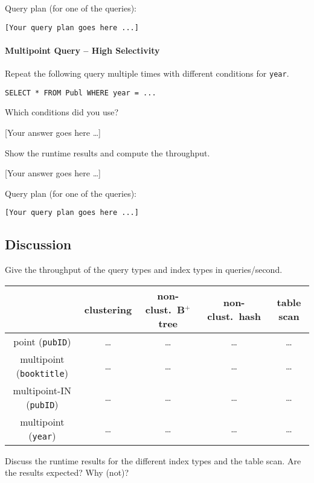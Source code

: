 \documentclass[11pt]{scrartcl}
\newcommand{\youranswerhere}{[Your answer goes here \ldots]}
\begin{document}
Query plan (for one of the queries):

{\small
\parskip0pt\begin{verbatim}
[Your query plan goes here ...]
\end{verbatim}}

\paragraph{Multipoint Query -- High Selectivity}

Repeat the following query multiple times with different conditions for \texttt{year}.

\begin{lstlisting}[style=dbtsql]
SELECT * FROM Publ WHERE year = ...
\end{lstlisting}

Which conditions did you use?

\youranswerhere{}

Show the runtime results and compute the throughput.

\youranswerhere{}

Query plan (for one of the queries):

{\small
\parskip0pt\begin{verbatim}
[Your query plan goes here ...]
\end{verbatim}}

\subsection*{Discussion}

Give the throughput of the query types and index types in queries/second.
\begin{table}[H]
  \centering
  \begin{tabular}{c|c|c|c|c}
    & clustering & non-clust.\ B$^+$ tree & non-clust.\ hash & table scan
      \tabularnewline
    \hline
    point (\texttt{pubID}) & \ldots & \ldots & \ldots & \ldots \tabularnewline
    \hline
    multipoint (\texttt{booktitle}) & \ldots & \ldots & \ldots & \ldots
      \tabularnewline
    \hline
		multipoint-IN (\texttt{pubID}) & \ldots & \ldots & \ldots & \ldots
      \tabularnewline
		\hline
    multipoint (\texttt{year}) & \ldots & \ldots & \ldots & \ldots
      \tabularnewline
  \end{tabular}
\end{table}

Discuss the runtime results for the different index types and the table scan. Are the results expected? Why (not)?
\end{document}
